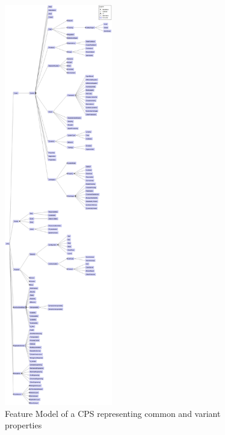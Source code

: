 \documentclass[final]{include/MPM4CPS/MPM4CPS-Report} %
\newcommand{\p}[1]{\textsf{#1}}
\begin{document}
\begin{figure}[!htb]
\includegraphics[width=0.42\textwidth]{figures/cps-ontology.png}  %
\caption{Feature Model of a CPS representing common and variant properties}
\label{fig:feature_model_cps}
\end{figure}


\newcommand{\CPSCyberPart}{\p{Cyber}\xspace}
\newcommand{\CPSPhysicalPart}{\p{Physical}\xspace}
\end{document}
